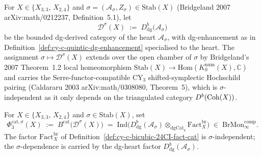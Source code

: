 \begin{definition}
\label{def:cy-c-bicubic-24CI-sigma-heart}
For $X \in \{X_{3,3},\, X_{2,4}\}$ and
$\sigma = (\mathcal A_\sigma, Z_\sigma) \in \mathrm{Stab}(X)$
(Bridgeland 2007 arXiv:math/0212237, Definition~5.1), let
\[
 \mathcal D^\sigma(X) \;:=\; D^b_{\mathrm{dg}}\bigl(\mathcal A_\sigma\bigr)
\]
be the bounded dg-derived category of the heart
$\mathcal A_\sigma$, with dg-enhancement as in
Definition~\ref{def:cy-c-quintic-dg-enhancement} specialised to the
heart. The assignment $\sigma \mapsto \mathcal D^\sigma(X)$ extends
over the open chamber of $\sigma$ by Bridgeland's 2007 Theorem~1.2
local homeomorphism
$\mathrm{Stab}(X) \to \mathrm{Hom}(K_0^{\mathrm{num}}(X), \mathbb C)$
and carries the Serre-functor-compatible CY$_3$ shifted-symplectic
Hochschild pairing (Caldararu 2003 arXiv:math/0308080, Theorem~5),
which is $\sigma$-independent as it only depends on the triangulated
category $D^b(\mathrm{Coh}(X))$.
\end{definition}

\begin{definition}
\label{def:cy-c-bicubic-24CI-phi-three-cat-sigma}
For $X \in \{X_{3,3},\, X_{2,4}\}$ and $\sigma \in \mathrm{Stab}(X)$,
set
\[
 \Phi_3^{\mathrm{cat},\sigma}(X)
 \;:=\;
 B^{\mathrm{cat}}\!\bigl(\mathcal D^\sigma(X)\bigr)
 \;=\;
 \mathrm{Ind}\!\bigl(
 D^b_{\mathrm{dg}}(\mathcal A_\sigma) \otimes_{\mathrm{dgCat}_k}
 \mathrm{Fact}^{\mathrm{br}}_X
 \bigr)
 \;\in\; \mathrm{BrMon}^{\mathrm{comp}}_\infty .
\]
The factor $\mathrm{Fact}^{\mathrm{br}}_X$ of
Definition~\ref{def:cy-c-bicubic-24CI-fact-cat} is
$\sigma$-independent; the $\sigma$-dependence is carried by the
dg-heart factor $D^b_{\mathrm{dg}}(\mathcal A_\sigma)$.
\end{definition}

